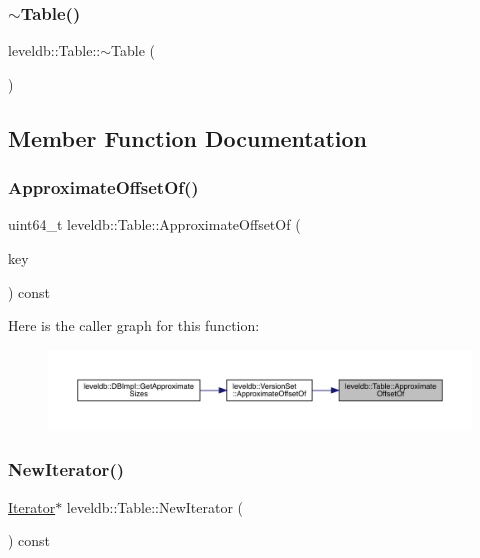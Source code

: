 \subsubsection{\texorpdfstring{$\sim$Table()}{~Table()}}
{\footnotesize\ttfamily leveldb\+::\+Table\+::$\sim$\+Table (\begin{DoxyParamCaption}{ }\end{DoxyParamCaption})}



\subsection{Member Function Documentation}
\mbox{\label{classleveldb_1_1_table_ae9f828f621836e12d154cbe78d6fba3e}} 
\subsubsection{\texorpdfstring{ApproximateOffsetOf()}{ApproximateOffsetOf()}}
{\footnotesize\ttfamily uint64\+\_\+t leveldb\+::\+Table\+::\+Approximate\+Offset\+Of (\begin{DoxyParamCaption}\item[{const \mbox{\hyperlink{classleveldb_1_1_slice}{Slice}} \&}]{key }\end{DoxyParamCaption}) const}

Here is the caller graph for this function\+:
\nopagebreak
\begin{figure}[H]
\begin{center}
\leavevmode
\includegraphics[width=350pt]{classleveldb_1_1_table_ae9f828f621836e12d154cbe78d6fba3e_icgraph}
\end{center}
\end{figure}
\mbox{\label{classleveldb_1_1_table_a022289eb109fe9b143052b5ed852096d}} 
\subsubsection{\texorpdfstring{NewIterator()}{NewIterator()}}
{\footnotesize\ttfamily \mbox{\hyperlink{classleveldb_1_1_iterator}{Iterator}}$\ast$ leveldb\+::\+Table\+::\+New\+Iterator (\begin{DoxyParamCaption}\item[{const \mbox{\hyperlink{structleveldb_1_1_read_options}{Read\+Options}} \&}]{ }\end{DoxyParamCaption}) const}

